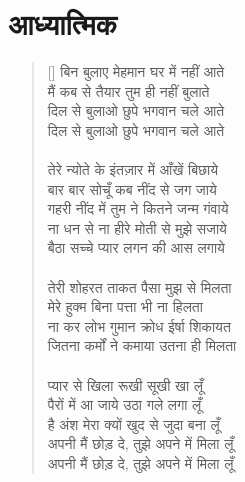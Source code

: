 \chapter{\texthindi{आध्यात्मिक}}

\begin{verse}[\versewidth]\texthindi{
बिन बुलाए मेहमान घर में नहीं आते\\
मैं कब से तैयार तुम ही नहीं बुलाते\\
दिल से बुलाओ छुपे भगवान चले आते\\
दिल से बुलाओ छुपे भगवान चले आते\\
\\
तेरे न्योते के इंतज़ार में आँखें बिछाये\\
बार बार सोचूँ कब नींद से जग जाये\\
गहरी नींद में तुम ने कितने जन्म गंवाये\\
ना धन से ना हीरे मोती से मुझे सजाये\\
बैठा सच्चे प्यार लगन की आस लगाये\\
\\
तेरी शोहरत ताकत पैसा मुझ से मिलता\\
मेरे हुक्म बिना पत्ता भी ना हिलता\\
ना कर लोभ गुमान क्रोध ईर्षा शिकायत\\
जितना कर्मों ने कमाया उतना ही मिलता\\
\\
प्यार से खिला रूखी सूखी खा लूँ\\
पैरों में आ जाये उठा गले लगा लूँ\\
है अंश मेरा क्यों खुद से जुदा बना लूँ\\
अपनी मैं छोड़ दे, तुझे अपने में मिला लूँ\\
अपनी मैं छोड़ दे, तुझे अपने में मिला लूँ
}
\end{verse}

